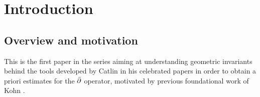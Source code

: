 \documentclass[12pt]{amsart}
\begin{document}
\def\bl{\begin{Lem}}
\def\el{\end{Lem}}
\def\bp{\begin{Pro}}
\def\ep{\end{Pro}}
\def\bt{\begin{Thm}}
\def\et{\end{Thm}}
\def\bc{\begin{Cor}}
\def\ec{\end{Cor}}
\def\bd{\begin{Def}}
\def\ed{\end{Def}}
\def\br{\begin{Rem}}
\def\er{\end{Rem}}
\def\be{\begin{Exa}}
\def\ee{\end{Exa}}
\def\bpf{\begin{proof}}
\def\epf{\end{proof}}
\def\ben{\begin{enumerate}}
\def\een{\end{enumerate}}
\def\beq{\begin{equation}}
\def\eeq{\end{equation}}


\section{Introduction}
\subsection{Overview and motivation}
This is the first paper in the series 
aiming at understanding geometric invariants
behind the tools developed by Catlin
in his celebrated papers 
\cite{C84a, C84b, C87}
in order to obtain a priori estimates for the $\bar{\partial}$ operator,
motivated by previous foundational work of Kohn \cite{K64a, K64b, K79}.
\end{document}
